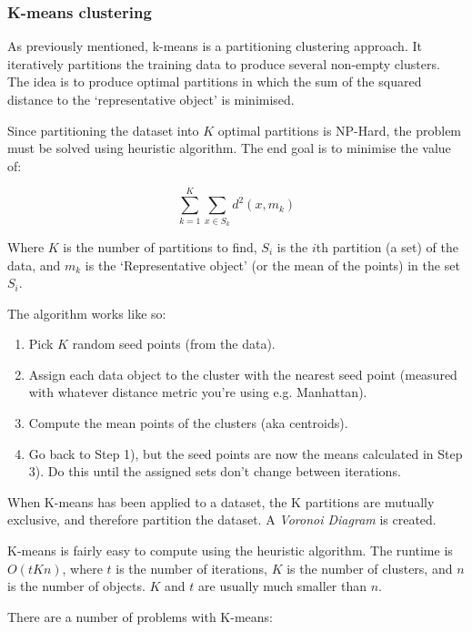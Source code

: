 \subsubsection{K-means clustering}

As previously mentioned, k-means is a partitioning clustering approach. It
iteratively partitions the training data to produce several non-empty clusters.
The idea is to produce optimal partitions in which the sum of the squared
distance to the `representative object' is minimised.

Since partitioning the dataset into $K$ optimal partitions is NP-Hard, the
problem must be solved using heuristic algorithm. The end goal is to minimise
the value of:

\[
  \sum\limits_{k=1}^K\sum\limits_{x \in S_k}d^2(x, m_k)
\]

Where $K$ is the number of partitions to find, $S_i$ is the $i$th partition (a
set) of the data, and $m_k$ is the `Representative object' (or the mean of the
points) in the set $S_i$.

The algorithm works like so:

\begin{enumerate}
  \item Pick $K$ random seed points (from the data).
  \item Assign each data object to the cluster with the nearest seed point
    (measured with whatever distance metric you're using e.g. Manhattan).
  \item Compute the mean points of the clusters (aka centroids).
  \item Go back to Step 1), but the seed points are now the means calculated in
    Step 3). Do this until the assigned sets don't change between iterations.
\end{enumerate}



When K-means has been applied to a dataset, the K partitions are mutually
exclusive, and therefore partition the dataset. A \textit{Voronoi Diagram} is
created.

K-means is fairly easy to compute using the heuristic algorithm. The runtime is
$O(tKn)$, where $t$ is the number of iterations, $K$ is the number of clusters,
and $n$ is the number of objects. $K$ and $t$ are usually much smaller than $n$.

There are a number of problems with K-means:

